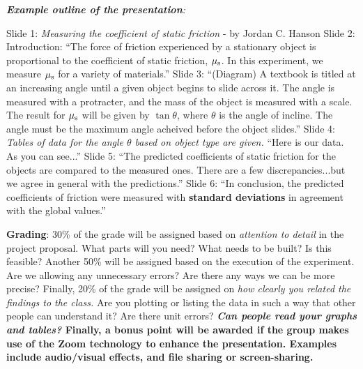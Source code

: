 \documentclass[10pt]{article}
\begin{document}
\textit{\textbf{Example outline of the presentation}:}
\begin{outline}[enumerate]
\1 Slide 1: \textit{Measuring the coefficient of static friction} - by Jordan C. Hanson
\1 Slide 2: Introduction: ``The force of friction experienced by a stationary object is proportional to the coefficient of static friction, $\mu_{\rm s}$.  In this experiment, we measure $\mu_{\rm s}$ for a variety of materials.''
\1 Slide 3: ``(Diagram) A textbook is titled at an increasing angle until a given object begins to slide across it.  The angle is measured with a protracter, and the mass of the object is measured with a scale.  The result for $\mu_{\rm s}$ will be given by $\tan\theta$, where $\theta$ is the angle of incline.  The angle must be the maximum angle acheived before the object slides.''
\1 Slide 4: \textit{Tables of data for the angle $\theta$ based on object type are given.}  ``Here is our data.  As you can see...''
\1 Slide 5: ``The predicted coefficients of static friction for the objects are compared to the measured ones.  There are a few discrepancies...but we agree in general with the predictions.''
\1 Slide 6: ``In conclusion, the predicted coefficients of friction were measured with \textbf{standard deviations} in agreement with the global values.''
\end{outline}
\textbf{Grading}: 30\% of the grade will be assigned based on \textit{attention to detail} in the project proposal.  What parts will you need?  What needs to be built?  Is this feasible?  Another 50\% will be assigned based on the execution of the experiment.  Are we allowing any unnecessary errors?  Are there any ways we can be more precise?  Finally, 20\% of the grade will be assigned on \textit{how clearly you related the findings to the class.}  Are you plotting or listing the data in such a way that other people can understand it?  Are there unit errors?  \textbf{\textit{Can people read your graphs and tables?} Finally, a bonus point will be awarded if the group makes use of the Zoom technology to enhance the presentation.  Examples include audio/visual effects, and file sharing or screen-sharing.}
\end{document}
